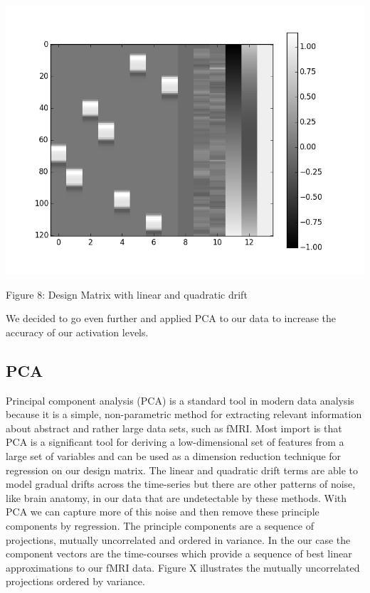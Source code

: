 \documentclass[12pt]{article}
\begin{document}
\begin{housevseverything}
    \centering
      \includegraphics[width=1\textwidth]{desing_matrix_dt_pca}
    \caption{Figure 8: Design Matrix with linear and quadratic drift}
\end{housevseverything}

We decided to go even further and applied PCA to our data to increase the accuracy of our activation levels. 

\subsection{PCA}
Principal component analysis (PCA) is a standard tool in modern data analysis 
because it is a simple, non-parametric method for extracting relevant 
information about abstract and rather large data sets, such as fMRI.  Most 
import is that PCA is a significant tool for deriving a low-dimensional set of 
features from a large set of variables and can be used as a dimension reduction 
technique for regression on our design matrix. The linear and quadratic drift 
terms are able to model gradual drifts across the time-series but there are 
other patterns of noise, like brain anatomy, in our data that are undetectable 
by these methods. With PCA we can capture more of this noise and then remove 
these principle components by regression. The principle components are a 
sequence of projections, mutually uncorrelated and ordered in variance. In the 
our case the component vectors are the time-courses which provide a sequence of 
best linear approximations to our fMRI data.  Figure X illustrates the mutually 
uncorrelated projections ordered by variance.
\end{document}
